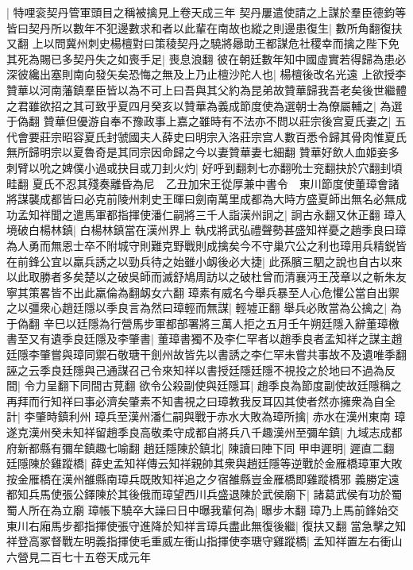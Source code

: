 |{
	特哩衮契丹管軍頭目之稱被擒見上卷天成三年}
契丹屢遣使請之上謀於羣臣德鈞等皆曰契丹所以數年不犯邊數求和者以此輩在南故也縱之則邊患復生|{
	數所角翻復扶又翻}
上以問冀州刺史楊檀對曰策稜契丹之驍將曏助王都謀危社稷幸而擒之陛下免其死為賜已多契丹失之如喪手足|{
	喪息浪翻}
彼在朝廷數年知中國虛實若得歸為患必深彼纔出塞則南向發矢矣恐悔之無及上乃止檀沙陀人也|{
	楊檀後改名光遠}
上欲授李贊華以河南藩鎮羣臣皆以為不可上曰吾與其父約為昆弟故贊華歸我吾老矣後世繼體之君雖欲招之其可致乎夏四月癸亥以贊華為義成節度使為選朝士為僚屬輔之|{
	為選于偽翻}
贊華但優游自奉不豫政事上嘉之雖時有不法亦不問以莊宗後宫夏氏妻之|{
	五代會要莊宗昭容夏氏封虢國夫人薛史曰明宗入洛莊宗宫人數百悉令歸其骨肉惟夏氏無所歸明宗以夏魯奇是其同宗因命歸之今以妻贊華妻七細翻}
贊華好飲人血姬妾多刺臂以吮之婢僕小過或抉目或刀刲火灼|{
	好呼到翻刺七亦翻吮士兖翻抉於穴翻刲頃畦翻}
夏氏不忍其殘奏離昏為尼　乙丑加宋王從厚兼中書令　東川節度使董璋會諸將謀襲成都皆曰必克前陵州刺史王暉曰劍南萬里成都為大時方盛夏師出無名必無成功孟知祥聞之遣馬軍都指揮使潘仁嗣將三千人詣漢州詗之|{
	詗古永翻又休正翻}
璋入境破白楊林鎮|{
	白楊林鎮當在漢州界上}
執戍將武弘禮聲勢甚盛知祥憂之趙季良曰璋為人勇而無恩士卒不附城守則難克野戰則成擒矣今不守巢穴公之利也璋用兵精鋭皆在前鋒公宜以羸兵誘之以勁兵待之始雖小衂後必大捷|{
	此孫臏三駟之說也自古以來以此取勝者多矣楚以之破吳師而滅舒鳩周訪以之破杜曾而清襄沔王茂章以之斬朱友寧其策畧皆不出此羸倫為翻衂女六翻}
璋素有威名今舉兵暴至人心危懼公當自出禦之以彊衆心趙廷隱以季良言為然曰璋輕而無謀|{
	輕墟正翻}
舉兵必敗當為公擒之|{
	為于偽翻}
辛巳以廷隱為行營馬步軍都部署將三萬人拒之五月壬午朔廷隱入辭董璋檄書至又有遺季良廷隱及李肇書|{
	董璋書獨不及李仁罕者以趙季良者孟知祥之謀主趙廷隱李肇嘗與璋同禦石敬瑭干劍州故皆先以書誘之李仁罕未嘗共事故不及遺唯季翻}
誣之云季良廷隱與己通謀召己令來知祥以書授廷隱廷隱不視投之於地曰不過為反間|{
	令力呈翻下同間古莧翻}
欲令公殺副使與廷隱耳|{
	趙季良為節度副使故廷隱稱之}
再拜而行知祥曰事必濟矣肇素不知書視之曰璋教我反耳囚其使者然亦擁衆為自全計|{
	李肇時鎮利州}
璋兵至漢州潘仁嗣與戰于赤水大敗為璋所擒|{
	赤水在漢州東南}
璋遂克漢州癸未知祥留趙季良高敬柔守成都自將兵八千趣漢州至彌牟鎮|{
	九域志成都府新都縣有彌牟鎮趣七喻翻}
趙廷隱陳於鎮北|{
	陳讀曰陣下同}
甲申遲明|{
	遲直二翻}
廷隱陳於雞蹤橋|{
	薛史孟知祥傳云知祥親帥其衆與趙廷隱等逆戰於金雁橋璋軍大敗按金雁橋在漢州雒縣南璋兵既敗知祥追之夕宿雒縣豈金雁橋即雞蹤橋邪}
義勝定遠都知兵馬使張公鐸陳於其後俄而璋望西川兵盛退陳於武侯廟下|{
	諸葛武侯有功於蜀蜀人所在為立廟}
璋帳下驍卒大譟曰日中曝我輩何為|{
	曝步木翻}
璋乃上馬前鋒始交東川右廂馬步都指揮使張守進降於知祥言璋兵盡此無復後繼|{
	復扶又翻}
當急擊之知祥登高冢督戰左明義指揮使毛重威左衝山指揮使李瑭守雞蹤橋|{
	孟知祥置左右衝山六營見二百七十五卷天成元年}
